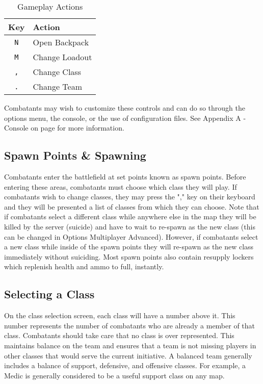 \begin{table}[h!b!p!]
\caption{Gameplay Actions}
\begin{center}
\begin{tabular}{|c|l|}
	\hline
		Key & Action\\
	\hline
	\texttt{N}&Open Backpack\\
	\texttt{M}&Change Loadout\\
	\texttt{,}&Change Class\\
	\texttt{.}&Change Team\\
  	\hline
\end{tabular}
\end{center}
\label{table_gameplay_actions}
\end{table}

Combatants may wish to customize these controls and can do so through the options menu, the console, or the use of configuration files. See Appendix A - Console on page \pageref{Appendix_A_Console} for more information.

\subsection{Spawn Points \& Spawning}
Combatants enter the battlefield at set points known as spawn points. Before entering these areas, combatants must choose which class they will play. If combatants wish to change classes, they may press the "," key on their keyboard and they will be presented a list of classes from which they can choose. Note that if combatants select a different class while anywhere else in the map they will be killed by the server (suicide) and have to wait to re-spawn as the new class (this can be changed in Options Multiplayer Advanced). However, if combatants select a new class while inside of the spawn points they will re-spawn as the new class immediately without suiciding. Most spawn points also contain resupply lockers which replenish health and ammo to full, instantly.

\subsection{Selecting a Class}
On the class selection screen, each class will have a number above it. This number represents the number of  combatants who are already a member of that class. Combatants should take care that no class is over represented. This maintains balance on the team and ensures that a team is not missing players in other classes that would serve the current initiative. A balanced team generally includes a balance of support, defensive, and offensive classes. For example, a Medic is generally considered to be a useful support class on any map.

